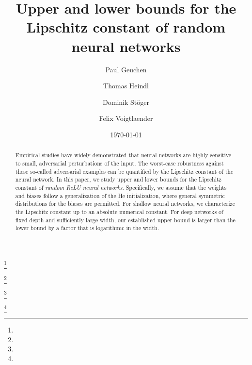 \documentclass[10pt, reqno]{amsart}
\theoremstyle{plain}
\theoremstyle{definition} %
\theoremstyle{remark} %
\numberwithin{equation}{section}
\begin{document}
\allowdisplaybreaks



\title[Upper and lower bounds for the Lipschitz constant of random neural networks]{Upper and lower bounds for the Lipschitz constant of random neural networks}



\author{Paul Geuchen}
\address[P. Geuchen]{Mathematical Institute for Machine Learning and Data Science (MIDS),
Catholic University of Eichstätt--Ingolstadt (KU),
Auf der Schanz 49, 85049 Ingolstadt, Germany}
\thanks{}

\author{Thomas Heindl}
\address[T. Heindl]{Chair of Mathematics --- Statistics,
Catholic University of Eichstätt--Ingolstadt (KU),
Ostenstraße 28,
85072 Eichstätt,
Germany}
\thanks{}

\author{Dominik Stöger}
\address[D. Stöger]{Mathematical Institute for Machine Learning and Data Science (MIDS),
Catholic University of Eichstätt--Ingolstadt (KU), Auf der Schanz 49, 85049 Ingolstadt, Germany}
\thanks{}

\author{Felix Voigtlaender}\thanks{}
\address[F. Voigtlaender]{Mathematical Institute for Machine Learning and Data Science (MIDS),
Catholic University of Eichstätt--Ingolstadt (KU), Auf der Schanz 49, 85049 Ingolstadt, Germany}






\date{\today}

\begin{abstract}    
Empirical studies have widely demonstrated that neural networks are highly sensitive to small,
adversarial perturbations of the input. %
The worst-case robustness against these so-called adversarial examples can be quantified by the Lipschitz constant of the neural network.
In this paper, we study upper and lower bounds for the Lipschitz constant of \textit{random ReLU neural networks}.
Specifically, we assume that the weights and biases follow a generalization of the He initialization, where general symmetric
distributions for the biases are permitted.
For shallow neural networks, we characterize the Lipschitz constant up to an absolute numerical constant.
For deep networks of fixed depth and sufficiently large width, our established upper bound is larger than the lower bound by a factor that is logarithmic in the width.
\end{abstract}
\end{document}

